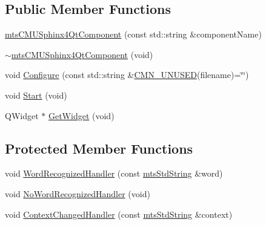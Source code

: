 \subsection*{Public Member Functions}
\begin{DoxyCompactItemize}
\item 
\hyperlink{classmts_c_m_u_sphinx4_qt_component_a99d06e5070cb5e6d5f98fde9c306fac2}{mts\+C\+M\+U\+Sphinx4\+Qt\+Component} (const std\+::string \&component\+Name)
\item 
\hyperlink{classmts_c_m_u_sphinx4_qt_component_a13a44800fbe7640f02e8858e7afb155f}{$\sim$mts\+C\+M\+U\+Sphinx4\+Qt\+Component} (void)
\item 
void \hyperlink{classmts_c_m_u_sphinx4_qt_component_ad5e5c6bcb776e24ed383a6cdbe4f158a}{Configure} (const std\+::string \&\hyperlink{cmn_portability_8h_a021894e2626935fa2305434b1e893ff6}{C\+M\+N\+\_\+\+U\+N\+U\+S\+E\+D}(filename)=\char`\"{}\char`\"{})
\item 
void \hyperlink{classmts_c_m_u_sphinx4_qt_component_a2ff0d587355344fbb79c8a51243b0c57}{Start} (void)
\item 
Q\+Widget $\ast$ \hyperlink{classmts_c_m_u_sphinx4_qt_component_a1004dc0a6a1793d23eda7ec0c50fbfeb}{Get\+Widget} (void)
\end{DoxyCompactItemize}
\subsection*{Protected Member Functions}
\begin{DoxyCompactItemize}
\item 
void \hyperlink{classmts_c_m_u_sphinx4_qt_component_addbc603b7e2ba691bdc10e5e6f902f48}{Word\+Recognized\+Handler} (const \hyperlink{mts_generic_object_proxy_8h_adbc21bfbf98367e582bf8a263b7e711f}{mts\+Std\+String} \&word)
\item 
void \hyperlink{classmts_c_m_u_sphinx4_qt_component_a390266dd80e6fc584e92530ef4e4e789}{No\+Word\+Recognized\+Handler} (void)
\item 
void \hyperlink{classmts_c_m_u_sphinx4_qt_component_a5ef01cde522691827956533901c85fdf}{Context\+Changed\+Handler} (const \hyperlink{mts_generic_object_proxy_8h_adbc21bfbf98367e582bf8a263b7e711f}{mts\+Std\+String} \&context)
\end{DoxyCompactItemize}
